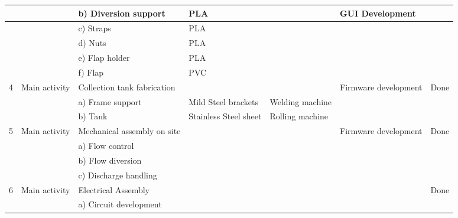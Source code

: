 \begin{landscape}
\begin{table}[]
{\begin{tabular}{|l|l|l|l|l|l|l|}
   &               & b) Diversion support                & PLA                   &                    & GUI Development       &         \\ \hline
   &               & c) Straps                           & PLA                   &                    &                       &         \\ \hline
   &               & d) Nuts                             & PLA                   &                    &                       &         \\ \hline
   &               & e) Flap holder                      & PLA                   &                    &                       &         \\ \hline
   &               & f) Flap                             & PVC                   &                    &                       &         \\ \hline
4  & Main activity & Collection tank fabrication         &                       &                    & Firmware development  & Done    \\ \hline
   &               & a) Frame support                    & Mild Steel brackets   & Welding machine    &                       &         \\ \hline
   &               & b) Tank                             & Stainless Steel sheet & Rolling machine    &                       &         \\ \hline
5  & Main activity & Mechanical assembly on site         &                       &                    & Firmware development  & Done    \\ \hline
   &               & a) Flow control                     &                       &                    &                       &         \\ \hline
   &               & b) Flow diversion                   &                       &                    &                       &         \\ \hline
   &               & c) Discharge handling               &                       &                    &                       &         \\ \hline
6  & Main activity & Electrical Assembly                 &                       &                    &                       & Done    \\ \hline
   &               & a) Circuit development              &                       &                    &                       &         \\ \hline

\end{tabular}}
\end{table}
\end{landscape}

